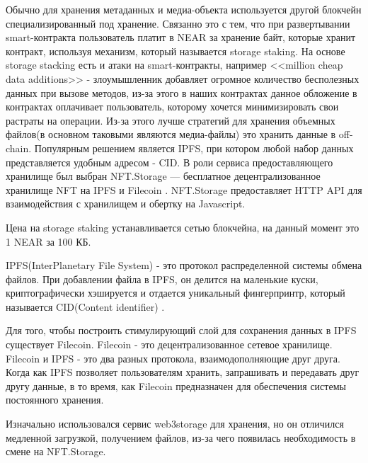 Обычно для хранения метаданных и медиа-объекта используется другой блокчейн специализированный под хранение. Связанно это с тем, что при развертывании smart-контракта пользователь платит в NEAR за хранение байт, которые хранит контракт, используя механизм, который называется storage staking. На основе storage stacking есть и атаки на smart-контракты, например <<million cheap data additions>> - злоумышленник добавляет огромное количество бесполезных данных при вызове методов, из-за этого в наших контрактах данное обложение в контрактах оплачивает пользователь, которому хочется минимизировать свои растраты на операции. Из-за этого лучше стратегий для хранения объемных файлов(в основном таковыми являются медиа-файлы) это хранить данные в off-chain. Популярным решением является IPFS, при котором любой набор данных представляется удобным адресом - CID. В роли сервиса предоставляющего хранилище был выбран NFT.Storage \cite{nftstorage} --- бесплатное децентрализованное хранилище NFT на IPFS \cite{ipfs} и Filecoin \cite{filecoin}. NFT.Storage предоставляет HTTP API для взаимодействия с хранилищем и обертку на Javascript.

\begin{remark}
    Цена на storage staking устанавливается сетью блокчейна, на данный момент это 1 NEAR за 100 КБ.
\end{remark}

\begin{definition}
    IPFS(InterPlanetary File System) - это протокол распределенной системы обмена файлов. При добавлении файла в IPFS, он делится на маленькие куски, криптографически хэшируется и отдается уникальный фингерпринтр, который называется CID(Content identifier)  \cite{ipfs}.
\end{definition}

\begin{remark}
    Для того, чтобы построить стимулирующий слой для сохранения данных в IPFS существует Filecoin. Filecoin - это децентрализованное сетевое хранилище. Filecoin и IPFS - это два разных протокола, взаимодополняющие друг друга. Когда как IPFS позволяет пользователям хранить, запрашивать и передавать друг другу данные, в то время, как Filecoin предназначен для обеспечения системы постоянного хранения.
\end{remark}

\begin{remark}
    Изначально использовался сервис web3storage \cite{web3storage} для хранения, но он отличился медленной загрузкой, получением файлов, из-за чего появилась необходимость в смене на NFT.Storage.
\end{remark}

